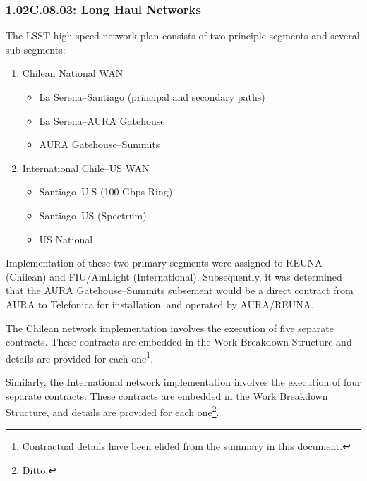 \subsubsection*{1.02C.08.03: Long Haul Networks}

The LSST high-speed network plan consists of two principle segments and
several sub-segments:

\begin{enumerate}
  \item{Chilean National WAN

    \begin{itemize}
      \item{La Serena--Santiago (principal and secondary paths)}
      \item{La Serena--AURA Gatehouse}
      \item{AURA Gatehouse--Summits}
    \end{itemize}
  }

  \item{International Chile--US WAN

    \begin{itemize}
      \item{Santiago--U.S (100 Gbps Ring)}
      \item{Santiago--US (Spectrum)}
      \item{US National}
    \end{itemize}
  }
\end{enumerate}

Implementation of these two primary segments were assigned to REUNA (Chilean)
and FIU/AmLight (International). Subsequently, it was determined that the AURA
Gatehouse--Summits subsement would be a direct contract from AURA to
Telefonica for installation, and operated by AURA/REUNA.

The Chilean network implementation involves the execution of five separate
contracts. These contracts are embedded in the Work Breakdown Structure and
details are provided for each one\footnote{Contractual details have been
elided from the summary in this document.}.

Similarly, the International network implementation involves the execution of
four separate contracts. These contracts are embedded in the Work Breakdown
Structure, and details are provided for each one\footnote{Ditto.}.
